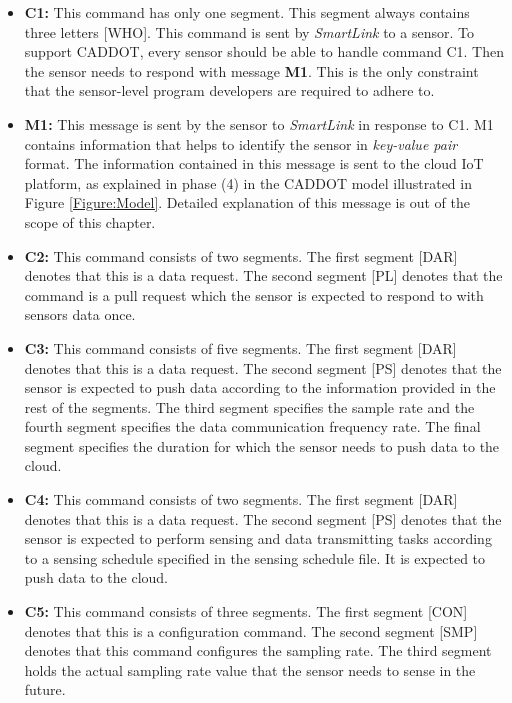 \documentclass[graybox]{svmult}
\begin{document}
\begin{itemize}
\item \textbf{C1:} This command has only one segment.  This segment always contains three letters [WHO]. This command is sent by \textit{SmartLink} to a sensor. To support CADDOT, every sensor should be able to handle command C1. Then the sensor needs to respond with message \textbf{M1}. This is the only constraint that the sensor-level program developers are required to adhere to. 



\item \textbf{M1:} This message is sent by the sensor to \textit{SmartLink} in response to C1. M1 contains information that helps to identify the sensor in \textit{key-value pair} format. The information contained in this message is sent to the cloud IoT platform, as explained in phase (4) in the CADDOT model illustrated in Figure \ref{Figure:Model}. Detailed explanation of this message is out of the scope of this chapter.



\item \textbf{C2:}  This command consists of two segments. The first segment [DAR] denotes that this is a data request. The second segment [PL] denotes that the command is a pull request which the sensor is expected to respond to with sensors data once.




\item \textbf{C3:}  This command consists of five segments. The first segment [DAR] denotes that this is a data request. The second segment [PS] denotes that the sensor is expected to push data according to the information provided in the rest of the segments. The third segment specifies the sample rate and the fourth segment specifies the data communication frequency rate. The final segment specifies the duration for which the sensor needs to push data to the cloud.



\item \textbf{C4:} This command consists of two segments. The first segment [DAR] denotes that this is a data request. The second segment [PS] denotes that the sensor is expected to perform sensing and data transmitting tasks according to a sensing schedule specified in the sensing schedule file. It is expected to push data to the cloud.




\item \textbf{C5:} This command consists of three segments. The first segment [CON] denotes that this is a configuration command. The second segment [SMP] denotes that this command configures the sampling rate. The third segment holds the actual sampling rate value that the sensor needs to sense in the future.




\end{itemize}
\end{document}
